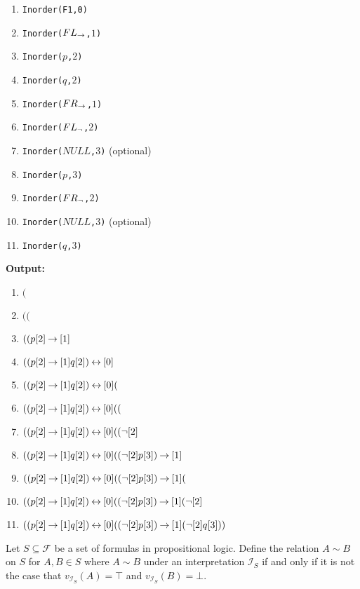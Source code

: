 \documentclass[]{exam}
\begin{document}
\begin{questions}
\begin{solution}
\begin{multicols}{2}
\begin{enumerate}
\item \texttt{Inorder(F1,0)}
\item \texttt{Inorder($FL_{\mathbin{\rightarrow}}$,$1$)}
\item \texttt{Inorder($p$,$2$)}
\item \texttt{Inorder($q$,$2$)}
\item \texttt{Inorder($FR_{\mathbin{\rightarrow}}$,$1$)}
\item \texttt{Inorder($FL_{\mathop{\neg}}$,$2$)}
\item \texttt{Inorder($NULL$,$3$)} (optional) 
\item \texttt{Inorder($p$,$3$)}
\item \texttt{Inorder($FR_{\mathop{\neg}}$,$2$)}
\item \texttt{Inorder($NULL$,$3$)} (optional) 
\item \texttt{Inorder($q$,$3$)}
\end{enumerate}
\columnbreak
{ \bf Output:}
\begin{enumerate}
\item $($
\item $(($
\item $((p[2] \mathbin{\rightarrow}[1]$
\item $((p[2] \mathbin{\rightarrow}[1] q[2]) \mathbin{\leftrightarrow}[0] $
\item $((p[2] \mathbin{\rightarrow}[1] q[2]) \mathbin{\leftrightarrow}[0] ($
\item $((p[2] \mathbin{\rightarrow}[1] q[2]) \mathbin{\leftrightarrow}[0] (($
\item $((p[2] \mathbin{\rightarrow}[1] q[2]) \mathbin{\leftrightarrow}[0] ((\mathop{\neg} [2]$
\item $((p[2] \mathbin{\rightarrow}[1] q[2]) \mathbin{\leftrightarrow}[0] ((\mathop{\neg} [2] p[3]) \mathbin{\rightarrow} [1] $
\item $((p[2] \mathbin{\rightarrow}[1] q[2]) \mathbin{\leftrightarrow}[0] ((\mathop{\neg} [2] p[3]) \mathbin{\rightarrow} [1] ($
\item $((p[2] \mathbin{\rightarrow}[1] q[2]) \mathbin{\leftrightarrow}[0] ((\mathop{\neg} [2] p[3]) \mathbin{\rightarrow} [1] (\mathop{\neg} [2] $
\item $((p[2] \mathbin{\rightarrow}[1] q[2]) \mathbin{\leftrightarrow}[0] ((\mathop{\neg} [2] p[3]) \mathbin{\rightarrow} [1] (\mathop{\neg} [2] q[3]))$
\end{enumerate}

\end{multicols}

\end{solution}
\question Let $S \subseteq \mathcal{F}$ be a set of formulas in propositional logic.
Define the relation $A\sim B$ on $S$ for $A,B \in S$ where $A\sim B$ under
an interpretation $\mathcal{I}_S$ if and only if it is not the case that
$v_{\mathcal{I}_S}(A) = \top$ and $v_{\mathcal{I}_S}(B) = \bot$.
\end{questions}
\end{document}
